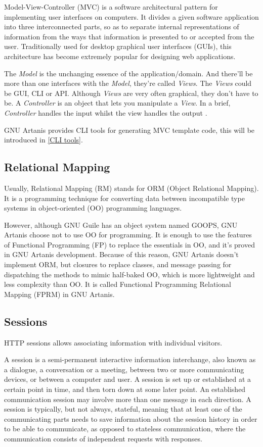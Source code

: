 \documentclass[numbers,numberedpars]{sigplanconf}
\begin{document}
Model-View-Controller (MVC) is a software architectural pattern for implementing user interfaces on computers. It divides a given software
application into three interconnected parts, so as to separate internal representations of information from the ways that information is
presented to or accepted from the user. Traditionally used for desktop graphical user interfaces (GUIs), this architecture has become extremely
popular for designing web applications.

The {\it Model} is the unchanging essence of the application/domain. And there'll be more than one interfaces with the {\it Model}, they're called
{\it Views}. The {\it Views} could be GUI, CLI or API. Although {\it Views} are very often graphical, they don’t have to be.
A {\it Controller} is an object that lets you manipulate a {\it View}. In a brief, {\it Controller} handles the input whilst the view handles the
output \citep{deacon2009model}.

GNU Artanis provides CLI tools for generating MVC template code, this will be introduced in \ref{CLI tools}.

\subsection{Relational Mapping}

Usually, Relational Mapping (RM) stands for ORM (Object Relational Mapping).
It is a programming technique for converting data between incompatible type systems in object-oriented (OO) programming languages.

However, although GNU Guile has an object system named GOOPS, GNU Artanis choose not to use OO for programming. It is enough
to use the features of Functional Programming (FP) to replace the essentials in OO, and it's proved in GNU Artanis development.
Because of this reason, GNU Artanis doesn't implement ORM, but closures to replace classes, and message passing for dispatching the methods
to mimic half-baked OO, which is more lightweight and less complexity than OO. It is called Functional Programming Relational Mapping (FPRM)
in GNU Artanis.

\subsection{Sessions}

HTTP sessions allows associating information with individual visitors.

A session is a semi-permanent interactive information interchange, also known as a dialogue, a conversation or a meeting, between two or more
communicating devices, or between a computer and user. A session is set up or established at a certain point in time, and then
torn down at some later point. An established communication session may involve more than one message in each direction. A session is typically,
but not always, stateful, meaning that at least one of the communicating parts needs to save information about the session history in order to be
able to communicate, as opposed to stateless communication, where the communication consists of independent requests with responses.
\end{document}
